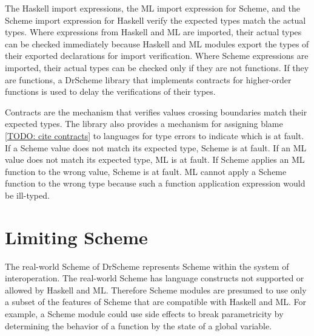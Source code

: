 The Haskell import expressions, the ML import expression for Scheme, and the Scheme import expression for Haskell verify the expected types match the actual types.  Where expressions from Haskell and ML are imported, their actual types can be checked immediately because Haskell and ML modules export the types of their exported declarations for import verification.  Where Scheme expressions are imported, their actual types can be checked only if they are not functions.  If they are functions, a DrScheme library that implements contracts for higher-order functions is used to delay the verifications of their types.

Contracts are the mechanism that verifies values crossing boundaries match their expected types.  The library also provides a mechanism for assigning blame \ref{TODO: cite contracts} to languages for type errors to indicate which is at fault.  If a Scheme value does not match its expected type, Scheme is at fault.  If an ML value does not match its expected type, ML is at fault.  If Scheme applies an ML function to the wrong value, Scheme is at fault.  ML cannot apply a Scheme function to the wrong type because such a function application expression would be ill-typed.

\section{Limiting Scheme}

The real-world Scheme of DrScheme represents Scheme within the system of interoperation.  The real-world Scheme has language constructs not supported or allowed by Haskell and ML.  Therefore Scheme modules are presumed to use only a subset of the features of Scheme that are compatible with Haskell and ML.  For example, a Scheme module could use side effects to break parametricity by determining the behavior of a function by the state of a global variable.